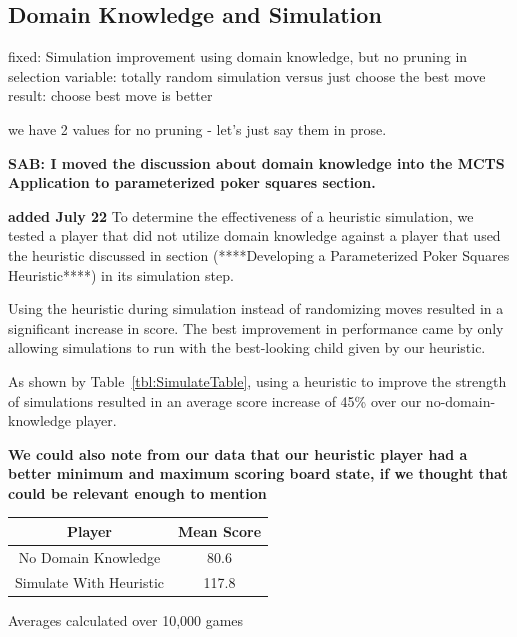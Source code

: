 \documentclass[letterpaper]{article}
\begin{document}
\subsection{Domain Knowledge and Simulation}

fixed: Simulation improvement using domain knowledge, but no pruning in selection
variable: totally random simulation versus just choose the best move 
result: choose best move is better

we have 2 values for no pruning - let's just say them in prose.


{\bf SAB: I moved the discussion about domain knowledge into the MCTS Application to parameterized poker squares section.}

{\bf added July 22} To determine the effectiveness of a heuristic simulation, we tested a player that did not utilize domain knowledge against a player that used the heuristic discussed in section (****Developing a Parameterized Poker Squares Heuristic****) in its simulation step. 

Using the heuristic during simulation instead of randomizing moves resulted in a significant increase in score. The best improvement in performance came by only allowing simulations to run with the best-looking child given by our heuristic. 

As shown by Table~\ref{tbl:SimulateTable}, using a heuristic to improve the strength of simulations resulted in an average score increase of 45\% over our no-domain-knowledge player.

{\bf We could also note from our data that our heuristic player had a better minimum and maximum scoring board state, if we thought that could be relevant enough to mention}

\begin{minipage}{\linewidth}
\centering
\label{tbl:SimulateTable}
\begin{tabular}{c c}
\hline
Player & Mean Score \\
\hline
No Domain Knowledge & 80.6 \\
Simulate With Heuristic & 117.8 \\
\hline
\end{tabular}\par
\bigskip
Averages calculated over 10,000 games
\end{minipage}
\end{document}
